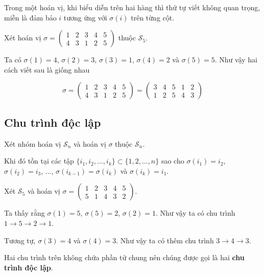 \begin{remark}
    Trong một hoán vị, khi biểu diễn trên hai hàng thì thứ tự viết không quan trọng, miễn là đảm bảo $i$ tương ứng với $\sigma(i)$ trên từng cột.
\end{remark}

\begin{example}
    Xét hoán vị $\sigma = \begin{pmatrix}
        1 & 2 & 3 & 4 & 5 \\ 4 & 3 & 1 & 2 & 5
    \end{pmatrix}$ thuộc $\mathcal{S}_5$.

    Ta có $\sigma(1) = 4$, $\sigma(2) = 3$, $\sigma(3) = 1$, $\sigma(4) = 2$
    và $\sigma(5) = 5$. Như vậy hai cách viết sau là giống nhau

    \begin{equation*}
        \sigma = 
        \begin{pmatrix}
            1 & 2 & 3 & 4 & 5 \\
            4 & 3 & 1 & 2 & 5
        \end{pmatrix} = 
        \begin{pmatrix}
            3 & 4 & 5 & 1 & 2 \\
            1 & 2 & 5 & 4 & 3
        \end{pmatrix}
    \end{equation*}
\end{example}

\subsection*{Chu trình độc lập}

Xét nhóm hoán vị $\mathcal{S}_n$ và hoán vị $\sigma$ thuộc $\mathcal{S}_n$.

Khi đó tồn tại các tập $\{ i_1, i_2, \ldots, i_k \} \subset \{1, 2, \ldots, n\}$
sao cho $\sigma(i_1) = i_2$, $\sigma(i_2) = i_3$, ..., $\sigma(i_{k-1})
= \sigma(i_k)$ và $\sigma(i_k) = i_1$.

\begin{example}
    Xét $\mathcal{S}_5$ và hoán vị $\sigma = \begin{pmatrix}
        1 & 2 & 3 & 4 & 5 \\ 5 & 1 & 4 & 3 & 2
    \end{pmatrix}$. 
    
    Ta thấy rằng $\sigma(1) = 5$, $\sigma(5) = 2$,
    $\sigma(2) = 1$. Như vậy ta có chu trình $1 \to 5 \to 2 \to 1$.

    Tương tự, $\sigma(3) = 4$ và $\sigma(4) = 3$. Như vậy ta
    có thêm chu trình $3 \to 4 \to 3$.

    Hai chu trình trên không chứa phần tử chung nên chúng được gọi là
    hai \textbf{chu trình độc lập}.
\end{example}

